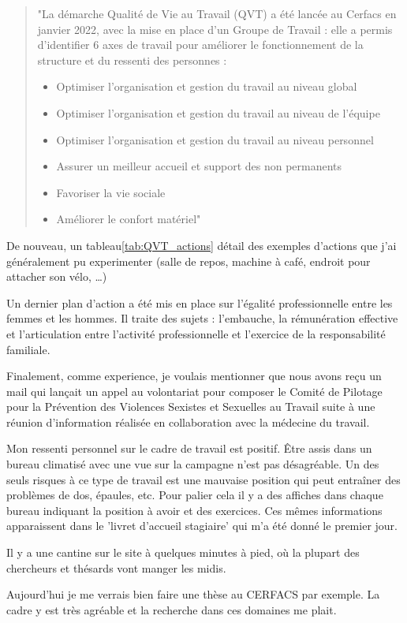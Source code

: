     \begin{quote}
        \setlength{\leftmargin}{0.5cm} %
        \setlength{\rightmargin}{0.5cm} %
        "La démarche Qualité de Vie au Travail (QVT) a été lancée au Cerfacs en janvier 2022, avec la mise en
        place d’un Groupe de Travail : elle a permis d’identifier 6 axes de travail pour améliorer le
        fonctionnement de la structure et du ressenti des personnes :
        \begin{itemize}
            \item Optimiser l’organisation et gestion du travail au niveau global
            \item Optimiser l’organisation et gestion du travail au niveau de l’équipe
            \item Optimiser l’organisation et gestion du travail au niveau personnel
            \item Assurer un meilleur accueil et support des non permanents
            \item Favoriser la vie sociale
            \item Améliorer le confort matériel"
        \end{itemize}
    \end{quote}

    De nouveau, un tableau\ref{tab:QVT_actions} détail des exemples d'actions que j'ai généralement pu experimenter (salle de repos, machine à café, endroit pour attacher son vélo, \dots)

    Un dernier plan d'action a été mis en place sur l'égalité professionnelle entre les femmes et les hommes. Il traite des sujets : l’embauche, la rémunération effective et l’articulation entre l’activité professionnelle et l’exercice de la responsabilité familiale.

    Finalement, comme experience, je voulais mentionner que nous avons reçu un mail qui lançait un appel au volontariat pour composer le Comité de Pilotage pour la Prévention des Violences Sexistes et Sexuelles au Travail suite à une réunion d'information réalisée en collaboration avec la médecine du travail.

\vspace{1cm}


Mon ressenti personnel sur le cadre de travail est positif. Être assis dans un bureau climatisé avec une vue sur la campagne n'est pas désagréable. Un des seuls risques à ce type de travail est une mauvaise position qui peut entraîner des problèmes de dos, épaules, etc. Pour palier cela il y a des affiches dans chaque bureau indiquant la position à avoir et des exercices. Ces mêmes informations apparaissent dans le 'livret d'accueil stagiaire' qui m'a été donné le premier jour.

Il y a une cantine sur le site à quelques minutes à pied, où la plupart des chercheurs et thésards vont manger les midis.

Aujourd'hui je me verrais bien faire une thèse au CERFACS par exemple. La cadre y est très agréable et la recherche dans ces domaines me plait.